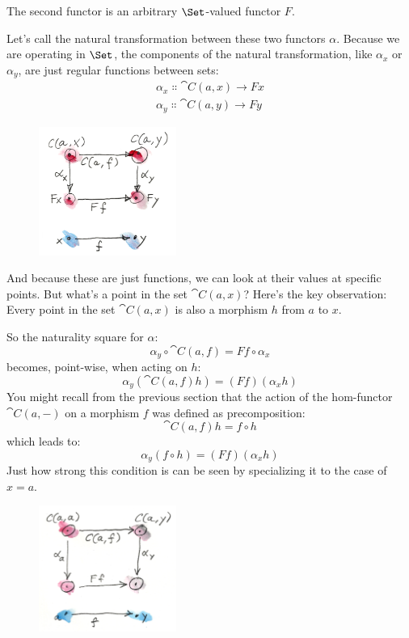 The second functor is an arbitrary $\Set$-valued functor
$F$.

Let's call the natural transformation between these two functors
$\alpha$. Because we are operating in $\Set$, the components of
the natural transformation, like $\alpha_x$ or $\alpha_y$, are just
regular functions between sets:
\begin{gather*}
\alpha_x \Colon \cat{C}(a, x) \to F x \\
\alpha_y \Colon \cat{C}(a, y) \to F y
\end{gather*}

\begin{figure}[H]
\centering
\includegraphics[width=0.4\textwidth]{images/yoneda1.png}
\end{figure}

\noindent
And because these are just functions, we can look at their values at
specific points. But what's a point in the set $\cat{C}(a, x)$? Here's
the key observation: Every point in the set $\cat{C}(a, x)$ is also a
morphism $h$ from $a$ to $x$.

So the naturality square for $\alpha$:
\[\alpha_y \circ \cat{C}(a, f) = F f \circ \alpha_x\]
becomes, point-wise, when acting on $h$:
\[\alpha_y (\cat{C}(a, f) h) = (F f) (\alpha_x h)\]
You might recall from the previous section that the action of the
hom-functor $\cat{C}(a,-)$ on a morphism $f$ was defined as
precomposition:
\[\cat{C}(a, f) h = f \circ h\]
which leads to:
\[\alpha_y (f \circ h) = (F f) (\alpha_x h)\]
Just how strong this condition is can be seen by specializing it to the
case of $x = a$.

\begin{figure}[H]
\centering
\includegraphics[width=0.4\textwidth]{images/yoneda2.png}
\end{figure}

